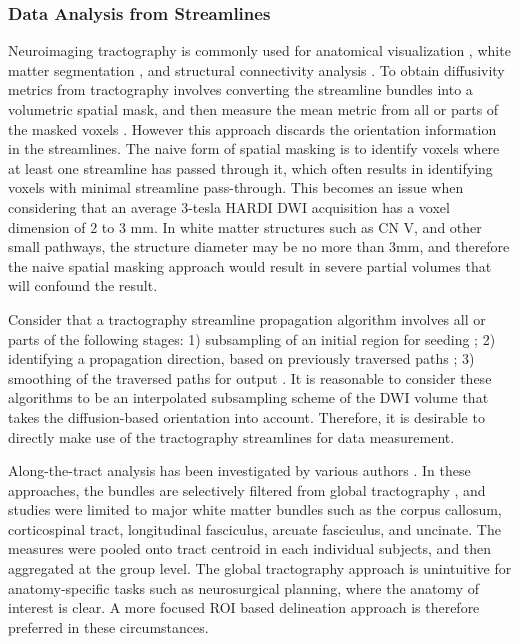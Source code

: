 \subsubsection{Data Analysis from Streamlines}
Neuroimaging tractography is commonly used for anatomical visualization \cite{Chen2011b}, white matter segmentation \cite{Behrens2003a,Johansen-Berg2005}, and structural connectivity analysis \cite{Cao2013,Wiech2014}. To obtain diffusivity metrics from tractography involves converting the streamline bundles into a volumetric spatial mask, and then measure the mean metric from all or parts of the masked voxels \cite{Concha2005,Fitzsimmons2009}. However this approach discards the orientation information in the streamlines. The naive form of spatial masking is to identify voxels where at least one streamline has passed through it, which often results in identifying voxels with minimal streamline pass-through. This becomes an issue when considering that an average 3-tesla HARDI DWI acquisition has a voxel dimension of 2 to 3 mm. In white matter structures such as CN V, and other small pathways, the structure diameter may be no more than 3mm, and therefore the naive spatial masking approach would result in severe partial volumes that will confound the result. 

Consider that a tractography streamline propagation algorithm involves all or parts of the following stages: 1) subsampling of an initial region for seeding \cite{Basser2002,Cote2012}; 2) identifying a propagation direction, based on previously traversed paths \cite{Malcolm2010,Qazi2009,Tournier2010}; 3) smoothing of the traversed paths for output \cite{Tuch2000d}. It is reasonable to consider these algorithms to be an interpolated subsampling scheme of the DWI volume that takes the diffusion-based orientation into account. Therefore, it is desirable to directly make use of the tractography streamlines for data measurement. 

Along-the-tract analysis has been investigated by various authors \cite{Colby2012,ODonnell2009,Wang2015,Yeatman2012}. In these approaches, the bundles are selectively filtered from global tractography \cite{Wang2015,Yeatman2012}, and studies were limited to major white matter bundles such as the corpus callosum, corticospinal tract, longitudinal fasciculus, arcuate fasciculus, and uncinate. The measures were pooled onto tract centroid in each individual subjects, and then aggregated at the group level. The global tractography approach is unintuitive for anatomy-specific tasks such as neurosurgical planning, where the anatomy of interest is clear. A more focused ROI based delineation approach is therefore preferred in these circumstances.

